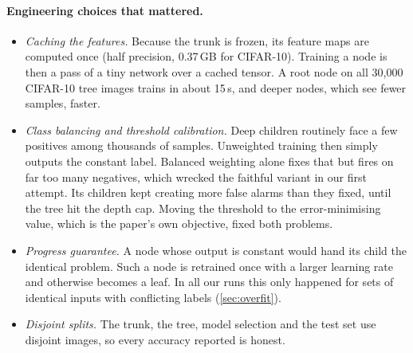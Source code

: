 \paragraph{Engineering choices that mattered.}
\begin{itemize}
\item \emph{Caching the features.} Because the trunk is frozen, its feature maps are computed once (half
precision, 0.37\,GB for CIFAR-10). Training a node is then a pass of a tiny network over a cached tensor. A
root node on all 30{,}000 CIFAR-10 tree images trains in about 15\,s, and deeper nodes, which see fewer samples, faster.
\item \emph{Class balancing and threshold calibration.} Deep children routinely face a few positives among
thousands of samples. Unweighted training then simply outputs the constant label. Balanced weighting alone
fixes that but fires on far too many negatives, which wrecked the faithful variant in our first attempt. Its
children kept creating more false alarms than they fixed, until the tree hit the depth cap. Moving the threshold
to the error-minimising value, which is the paper's own objective, fixed both problems.
\item \emph{Progress guarantee.} A node whose output is constant would hand its child the identical problem.
Such a node is retrained once with a larger learning rate and otherwise becomes a leaf. In all our runs this
only happened for sets of identical inputs with conflicting labels (\cref{sec:overfit}).
\item \emph{Disjoint splits.} The trunk, the tree, model selection and the test set use disjoint images, so
every accuracy reported is honest.
\end{itemize}
